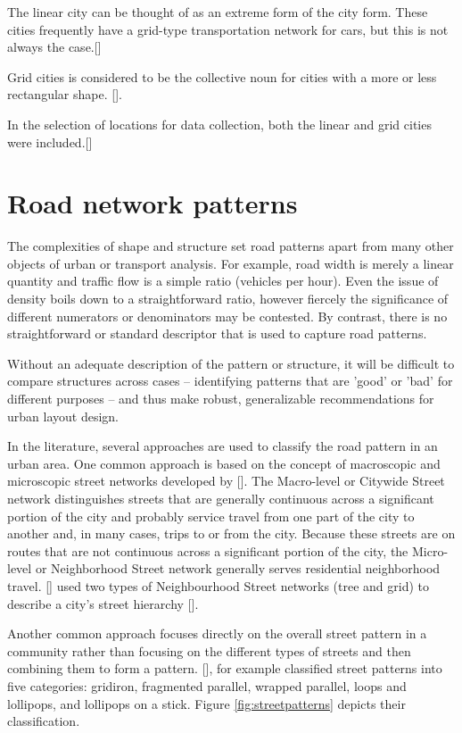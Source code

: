 The linear city can be thought of as an extreme form of the city form. These cities frequently have a grid-type transportation network for cars, but this is not always the case.[\cite{Snellen:2002}] 

Grid cities is considered to be the collective noun for cities with a more or less rectangular shape. [\cite{Snellen:2002}].

In the selection of locations for data collection, both the linear and grid cities were included.[\cite{Snellen:2002}]

\section{Road network patterns}
The complexities of shape and structure set road patterns apart from many other objects of urban or transport analysis. For example, road width is merely a linear quantity and traffic flow is a simple ratio (vehicles per hour). Even the issue of density boils down to a straightforward ratio, however fiercely the significance of different numerators or denominators may be contested. By contrast, there is no straightforward or standard descriptor that is used to capture road patterns. 

Without an adequate description of the pattern or structure, it will be difficult to compare structures across cases – identifying patterns that are 'good' or 'bad' for different purposes – and thus make robust, generalizable recommendations for urban layout design.

In the literature, several approaches are used to classify the road pattern in an urban area. One common approach is based on the concept of macroscopic and microscopic street networks developed by [\cite{Marshall:2005}]. The Macro-level or Citywide Street network distinguishes streets that are generally continuous across a significant portion of the city and probably service travel from one part of the city to another and, in many cases, trips to or from the city. Because these streets are on routes that are not continuous across a significant portion of the city, the Micro-level or Neighborhood Street network generally serves residential neighborhood travel. [\cite{Marshall:2005}] used two types of Neighbourhood Street networks (tree and grid) to describe a city's street hierarchy [\cite{Marshall:2010, Marshall:2011}]. 

Another common approach focuses directly on the overall street pattern in a community rather than focusing on the different types of streets and then combining them to form a pattern. [\cite{Southworth:2003}], for example classified street patterns into five categories: gridiron, fragmented parallel, wrapped parallel, loops and lollipops, and lollipops on a stick. Figure \ref{fig:streetpatterns} depicts their classification.

